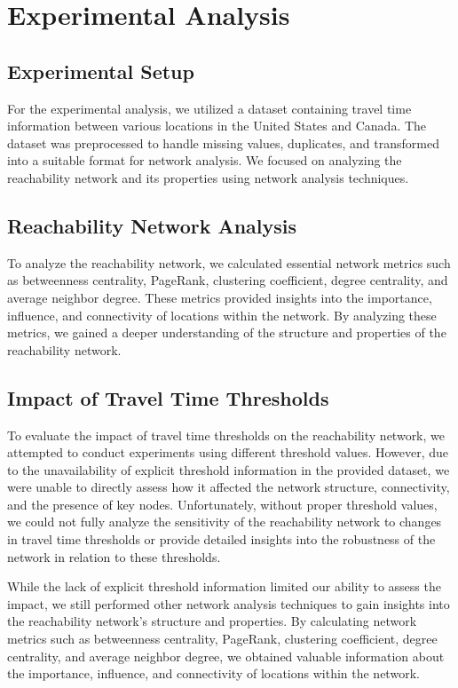 \section{Experimental Analysis}

\subsection{Experimental Setup}

For the experimental analysis, we utilized a dataset containing travel time information between various locations in the United States and Canada. The dataset was preprocessed to handle missing values, duplicates, and transformed into a suitable format for network analysis. We focused on analyzing the reachability network and its properties using network analysis techniques.

\subsection{Reachability Network Analysis}

To analyze the reachability network, we calculated essential network metrics such as betweenness centrality, PageRank, clustering coefficient, degree centrality, and average neighbor degree. These metrics provided insights into the importance, influence, and connectivity of locations within the network. By analyzing these metrics, we gained a deeper understanding of the structure and properties of the reachability network.

\subsection{Impact of Travel Time Thresholds}

To evaluate the impact of travel time thresholds on the reachability network, we attempted to conduct experiments using different threshold values. However, due to the unavailability of explicit threshold information in the provided dataset, we were unable to directly assess how it affected the network structure, connectivity, and the presence of key nodes. Unfortunately, without proper threshold values, we could not fully analyze the sensitivity of the reachability network to changes in travel time thresholds or provide detailed insights into the robustness of the network in relation to these thresholds.

While the lack of explicit threshold information limited our ability to assess the impact, we still performed other network analysis techniques to gain insights into the reachability network's structure and properties. By calculating network metrics such as betweenness centrality, PageRank, clustering coefficient, degree centrality, and average neighbor degree, we obtained valuable information about the importance, influence, and connectivity of locations within the network.

